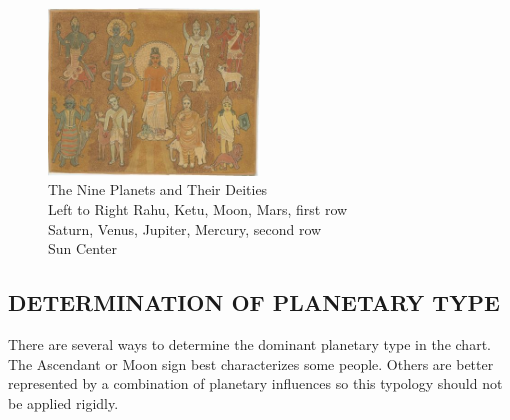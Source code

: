  \begin{figure}[H]
 \centering
\includegraphics[width=0.5\textwidth]{pics/planetary_types-1.png}
\caption{ The Nine Planets and Their Deities\\
Left to Right Rahu, Ketu, Moon, Mars, first row\\
Saturn, Venus, Jupiter, Mercury, second row\\
Sun Center\\}
 \end{figure}





\subsection{DETERMINATION OF PLANETARY TYPE }
 

There are several ways to determine the dominant planetary type in the chart. The Ascendant or Moon sign best characterizes some people. Others are better represented by a combination of planetary influences so this typology should not be applied rigidly. 

 

